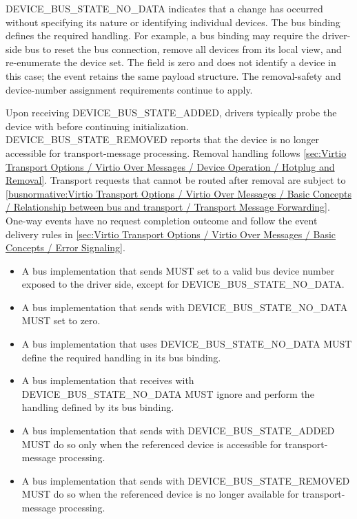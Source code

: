DEVICE\_BUS\_STATE\_NO\_DATA indicates that a change has occurred without
specifying its nature or identifying individual devices. The bus binding
defines the required handling. For example, a bus binding may require the
driver-side bus to reset the bus connection, remove all devices from its local
view, and re-enumerate the device set. The  field is zero
and does not identify a device in this case; the event retains the same payload
structure. The removal-safety and device-number assignment requirements
continue to apply.

Upon receiving DEVICE\_BUS\_STATE\_ADDED, drivers typically probe the device
with  before continuing initialization.
DEVICE\_BUS\_STATE\_REMOVED reports that the device is no longer accessible
for transport-message processing. Removal handling follows
\ref{sec:Virtio Transport Options / Virtio Over Messages / Device Operation / Hotplug and Removal}.
Transport requests that cannot be routed after removal are subject to
\ref{busnormative:Virtio Transport Options / Virtio Over Messages / Basic Concepts / Relationship between bus and transport / Transport Message Forwarding}.
One-way events have no request completion outcome and follow the event delivery
rules in
\ref{sec:Virtio Transport Options / Virtio Over Messages / Basic Concepts / Error Signaling}.

\begin{itemize}
  \item A bus implementation that sends  MUST set
         to a valid bus device number exposed to the
        driver side, except for DEVICE\_BUS\_STATE\_NO\_DATA.
  \item A bus implementation that sends  with
        DEVICE\_BUS\_STATE\_NO\_DATA MUST set  to zero.
  \item A bus implementation that uses DEVICE\_BUS\_STATE\_NO\_DATA MUST
        define the required handling in its bus binding.
  \item A bus implementation that receives  with
        DEVICE\_BUS\_STATE\_NO\_DATA MUST ignore  and
        perform the handling defined by its bus binding.
  \item A bus implementation that sends  with
        DEVICE\_BUS\_STATE\_ADDED MUST do so only when the referenced device is
        accessible for transport-message processing.
  \item A bus implementation that sends  with
        DEVICE\_BUS\_STATE\_REMOVED MUST do so when the referenced device is no
        longer available for transport-message processing.
\end{itemize}
